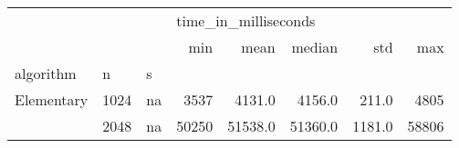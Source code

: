 \begin{tabular}{lllrrrrr}
\toprule
           &      &    & \multicolumn{5}{l}{time\_in\_milliseconds} \\
           &      &    &                  min &     mean &   median &     std &    max \\
algorithm & n & s &                      &          &          &         &        \\
\midrule
Elementary & 1024 & na &                 3537 &   4131.0 &   4156.0 &   211.0 &   4805 \\
           & 2048 & na &                50250 &  51538.0 &  51360.0 &  1181.0 &  58806 \\
\bottomrule
\end{tabular}
